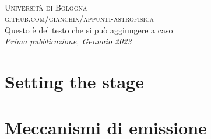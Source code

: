 \documentclass[11pt]{book} %
\begin{document}
\newpage
~\vfill
\thispagestyle{empty}


\noindent \textsc{Università di Bologna}\\

\noindent \textsc{github.com/gianchix/appunti-astrofisica}\\ %

\noindent Questo è del testo che si può aggiungere a caso\\ %

\noindent \textit{Prima pubblicazione, Gennaio 2023} %



\pagestyle{empty} %

\hypersetup{linkcolor = black}
\tableofcontents %


\pagestyle{fancy} %
\hypersetup{linkcolor = ocre}




%
{} %
\chapter{Setting the stage}




\chapter{Meccanismi di emissione}






\end{document}
